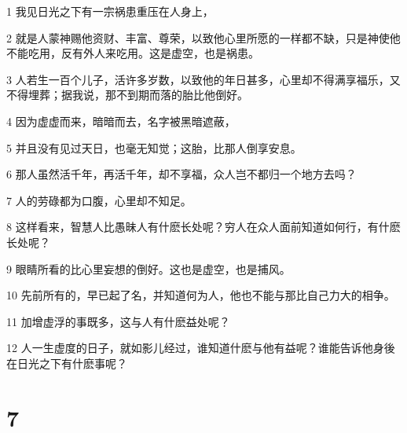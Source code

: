 \par 1 我见日光之下有一宗祸患重压在人身上，
\par 2 就是人蒙神赐他资财、丰富、尊荣，以致他心里所愿的一样都不缺，只是神使他不能吃用，反有外人来吃用。这是虚空，也是祸患。
\par 3 人若生一百个儿子，活许多岁数，以致他的年日甚多，心里却不得满享福乐，又不得埋葬；据我说，那不到期而落的胎比他倒好。
\par 4 因为虚虚而来，暗暗而去，名字被黑暗遮蔽，
\par 5 并且没有见过天日，也毫无知觉；这胎，比那人倒享安息。
\par 6 那人虽然活千年，再活千年，却不享福，众人岂不都归一个地方去吗？
\par 7 人的劳碌都为口腹，心里却不知足。
\par 8 这样看来，智慧人比愚昧人有什麽长处呢？穷人在众人面前知道如何行，有什麽长处呢？
\par 9 眼睛所看的比心里妄想的倒好。这也是虚空，也是捕风。
\par 10 先前所有的，早已起了名，并知道何为人，他也不能与那比自己力大的相争。
\par 11 加增虚浮的事既多，这与人有什麽益处呢？
\par 12 人一生虚度的日子，就如影儿经过，谁知道什麽与他有益呢？谁能告诉他身後在日光之下有什麽事呢？

\chapter{7}

